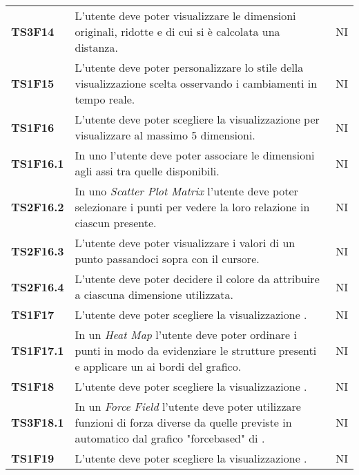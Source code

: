 {\begin{longtable}{ C{2cm} | C{12cm}| C{1.5cm} }
\textbf{TS3F14} & 
L'utente deve poter visualizzare le dimensioni originali, ridotte e di cui si è calcolata una distanza. & 
NI\\

\textbf{TS1F15} & 
L'utente deve poter personalizzare lo stile della visualizzazione scelta osservando i cambiamenti in tempo reale. & 
NI\\

\textbf{TS1F16} & 
L'utente deve poter scegliere la visualizzazione  per visualizzare  al massimo 5 dimensioni. & 
NI\\

\textbf{TS1F16.1} & 
In uno  l'utente deve poter associare le dimensioni agli assi tra quelle disponibili. & 
NI\\

\textbf{TS2F16.2} & 
In uno \textit{Scatter Plot Matrix} l'utente deve poter selezionare i punti per vedere la loro relazione in ciascun  presente. & 
NI\\

\textbf{TS2F16.3} & 
L'utente deve poter visualizzare i valori di un punto passandoci sopra con il cursore. & 
NI\\

\textbf{TS2F16.4} & 
L'utente deve poter decidere il colore da attribuire a ciascuna dimensione utilizzata. & 
NI\\

\textbf{TS1F17} & 
L'utente deve poter scegliere la visualizzazione . & 
NI\\

\textbf{TS1F17.1} & 
In un \textit{Heat Map} l'utente deve poter ordinare i punti in modo da evidenziare le strutture presenti e applicare un  ai bordi del grafico. & 
NI\\

\textbf{TS1F18} & 
L'utente deve poter scegliere la visualizzazione . & 
NI\\

\textbf{TS3F18.1} & 
In un \textit{Force Field} l'utente deve poter utilizzare funzioni di forza diverse da quelle previste in automatico dal grafico "forcebased" di . & 
NI\\

\textbf{TS1F19} & 
L'utente deve poter scegliere la visualizzazione . & 
NI\\


\end{longtable}}
